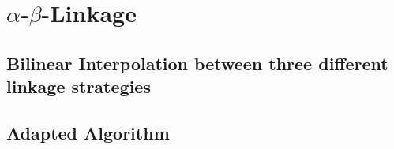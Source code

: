 \chapter{$\alpha$-$\beta$-Linkage}
\label{sec:alphabeta}

\section{Bilinear Interpolation between three different linkage strategies}

\section{Adapted Algorithm}